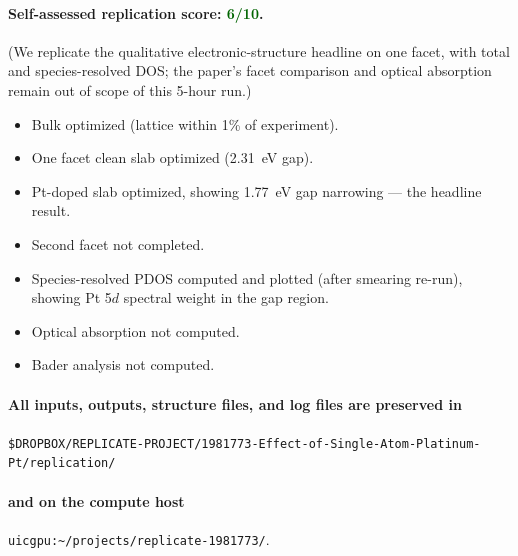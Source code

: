 \documentclass[11pt]{article}
\begin{document}
\paragraph{Self-assessed replication score: \textcolor{darkgreen}{\textbf{6/10}}.}
(We replicate the qualitative electronic-structure headline on one facet, with total and species-resolved DOS; the paper's facet comparison and optical absorption remain out of scope of this 5-hour run.)
\begin{itemize}[leftmargin=*]
    \item[\textcolor{darkgreen}{$\checkmark$}] Bulk optimized (lattice within 1\% of experiment).
    \item[\textcolor{darkgreen}{$\checkmark$}] One facet clean slab optimized (2.31~eV gap).
    \item[\textcolor{darkgreen}{$\checkmark$}] Pt-doped slab optimized, showing 1.77~eV gap narrowing --- the headline result.
    \item[\textcolor{darkred}{$\times$}] Second facet not completed.
    \item[\textcolor{darkgreen}{$\checkmark$}] Species-resolved PDOS computed and plotted (after smearing re-run), showing Pt 5$d$ spectral weight in the gap region.
    \item[\textcolor{darkred}{$\times$}] Optical absorption not computed.
    \item[\textcolor{darkred}{$\times$}] Bader analysis not computed.
\end{itemize}

\paragraph{All inputs, outputs, structure files, and log files are
preserved in}
\texttt{\$DROPBOX/REPLICATE-PROJECT/1981773-Effect-of-Single-Atom-Platinum-Pt/replication/}
\paragraph{and on the compute host}
\texttt{uicgpu:\textasciitilde/projects/replicate-1981773/}.
\end{document}

